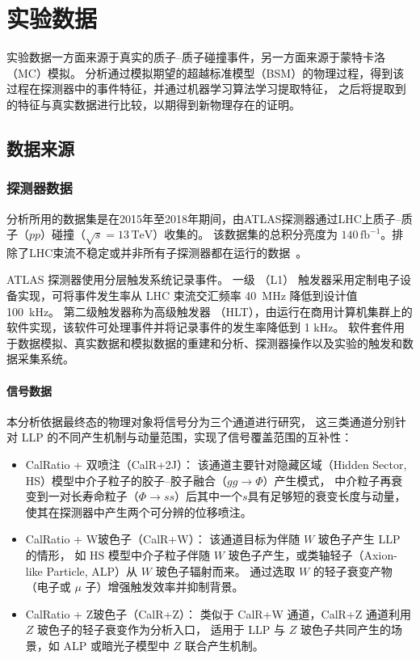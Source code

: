 
\chapter{实验数据}
实验数据一方面来源于真实的质子--质子碰撞事件，另一方面来源于蒙特卡洛（MC）模拟。
分析通过模拟期望的超越标准模型（BSM）的物理过程，得到该过程在探测器中的事件特征，并通过机器学习算法学习提取特征，
之后将提取到的特征与真实数据进行比较，以期得到新物理存在的证明。

\section{数据来源}

\subsection{探测器数据}
\label{sec:detector_data}

分析所用的数据集是在2015年至2018年期间，由ATLAS探测器通过LHC上质子--质子（$pp$）碰撞（$\sqrt{s} = 13\,\mathrm{TeV}$）收集的。
该数据集的总积分亮度为 $140\,\mathrm{fb}^{-1}$。排除了LHC束流不稳定或并非所有子探测器都在运行的数据~\cite{ATLAS_data_quality}。

ATLAS 探测器使用分层触发系统记录事件。
一级 （L1） 触发器采用定制电子设备实现，可将事件发生率从 LHC 束流交汇频率 40~MHz 降低到设计值 100~kHz。
第二级触发器称为高级触发器 （HLT），由运行在商用计算机集群上的软件实现，该软件可处理事件并将记录事件的发生率降低到 1 kHz。
软件套件用于数据模拟、真实数据和模拟数据的重建和分析、探测器操作以及实验的触发和数据采集系统。


\subsubsection{信号数据}
本分析依据最终态的物理对象将信号分为三个通道进行研究，
这三类通道分别针对 LLP 的不同产生机制与动量范围，实现了信号覆盖范围的互补性：
\begin{itemize}
    \item {CalRatio + 双喷注（CalR+2J）：} 该通道主要针对隐藏区域（Hidden Sector, HS）模型中介子粒子的胶子–胶子融合（$gg \to \Phi$）产生模式，
          中介粒子再衰变到一对长寿命粒子（$\Phi \to ss$）后其中一个$s$具有足够短的衰变长度与动量，使其在探测器中产生两个可分辨的位移喷注。

    \item {CalRatio + W玻色子（CalR+W）：} 该通道目标为伴随 $W$ 玻色子产生 LLP 的情形，
          如 HS 模型中介子粒子伴随 $W$ 玻色子产生，或类轴轻子（Axion-like Particle, ALP）从 $W$ 玻色子辐射而来。
          通过选取 $W$ 的轻子衰变产物（电子或 $\mu$ 子）增强触发效率并抑制背景。

    \item {CalRatio + Z玻色子（CalR+Z）：} 类似于 CalR+W 通道，CalR+Z 通道利用 $Z$ 玻色子的轻子衰变作为分析入口，
          适用于 LLP 与 $Z$ 玻色子共同产生的场景，如 ALP 或暗光子模型中 $Z$ 联合产生机制。
\end{itemize}

